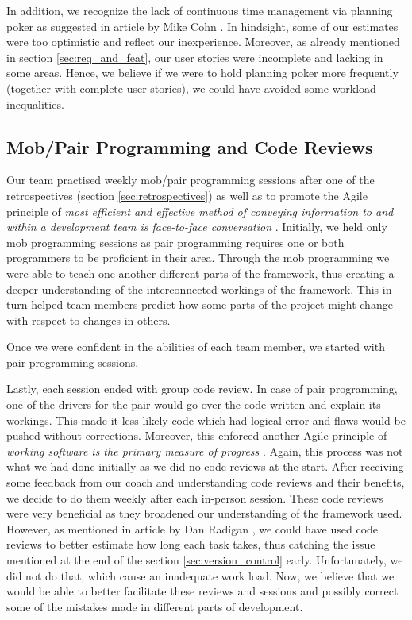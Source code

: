 \documentclass{l3proj}
\begin{document}
        In addition, we recognize the lack of continuous time management via planning poker as suggested in article by Mike Cohn \cite{continuous_poker}. In hindsight, some of our estimates were too optimistic and reflect our inexperience. Moreover, as already mentioned in section \ref{sec:req_and_feat}, our user stories were incomplete and lacking in some areas. Hence, we believe if we were to hold planning poker more frequently (together with complete user stories), we could have avoided some workload inequalities.
        
        
        
    \subsection{Mob/Pair Programming and Code Reviews}
    \label{sec:mob}
        Our team practised weekly mob/pair programming sessions after one of the retrospectives (section \ref{sec:retrospectives}) as well as to promote the Agile principle of \textit{most efficient and effective method of conveying information to and within a development team is face-to-face conversation} \cite{manifesto}. Initially, we held only mob programming sessions as pair programming requires one or both programmers to be proficient in their area. Through the mob programming we were able to teach one another different parts of the framework, thus creating a deeper understanding of the interconnected workings of the framework. This in turn helped team members predict how some parts of the project might change with respect to changes in others.

        Once we were confident in the abilities of each team member, we started with pair programming sessions.

        Lastly, each session ended with group code review. In case of pair programming, one of the drivers for the pair would go over the code written and explain its workings. This made it less likely code which had logical error and flaws would be pushed without corrections. Moreover, this enforced another Agile principle of \textit{working software is the primary measure of progress} \cite{manifesto}. Again, this process was not what we had done initially as we did no code reviews at the start. After receiving some feedback from our coach and understanding code reviews and their benefits, we decide to do them weekly after each in-person session. These code reviews were very beneficial as they broadened our understanding of the framework used. However, as mentioned in article by Dan Radigan \cite{code_review}, we could have used code reviews to better estimate how long each task takes, thus catching the issue mentioned at the end of the section \ref{sec:version_control} early. Unfortunately, we did not do that, which cause an inadequate work load. Now, we believe that we would be able 
        to better facilitate these reviews and sessions and possibly correct some of the mistakes made in different parts of development.
\end{document}
